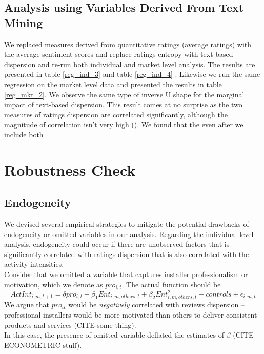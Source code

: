 \documentclass[msom,blindrev]{informs3}
\begin{document}
\subsection{Analysis using Variables Derived From Text Mining} 
We replaced measures derived from quantitative ratings (average ratings)  with the
average sentiment scores and replace ratings entropy with text-based dispersion and re-run both individual and market level analysis. The results are presented in table \ref{reg_ind_3} and table \ref{reg_ind_4} . Likewise we run the same regression on the market level data and presented the results in table \ref{reg_mkt_2}. We observe the same type of inverse U shape for the marginal impact of text-based dispersion. This result comes at no surprise as the two measures of ratings dispersion are correlated significantly, although the magnitude of correlation isn't very high ().  We found that the even after we include both  \\

\section{Robustness Check}
\subsection{Endogeneity}
 
We devised several empirical strategies to mitigate the potential drawbacks of endogeneity or omitted variables in our analysis. Regarding the individual level analysis, endogeneity could occur if there are unobserved factors that is significantly correlated with ratings dispersion that is also correlated with the activity intensities.\\
Consider that we omitted a variable that captures installer professionalism or motivation, which we denote as $pro_{i,t}$. The actual function should be
\begin{equation}
ActInt_{i,m,t+1}=\delta pro_{i,t}+\beta_{1} Ent_{i,m,others,t}+\beta_{2}Ent_{i,m,others,t}^2+controls+\epsilon_{i,m,t}
\end{equation}
We argue that $pro_{it}$ would be \textit{negatively} correlated with reviews dispersion -- professional installers would be more motivated than others to deliver consistent products and services (CITE some thing).  \\

In this case, the presence of omitted variable deflated the estimates of $\beta$ (CITE ECONOMETRIC stuff). \\
\end{document}
